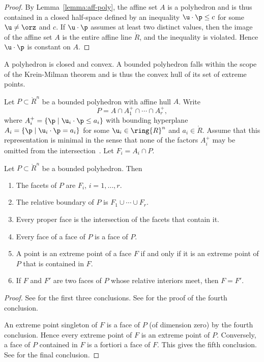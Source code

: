 \begin{proof}
By Lemma~\ref{lemma:aff-poly},
the affine set $A$ is a polyhedron and is thus contained in a closed half-space defined by an
inequality $\u\cdot\p \le c$ for some $\u\ne \orz$ and $c$.  If $\u\cdot\p$ assumes
at least two distinct values, then the image of the affine set $A$ 
is the entire affine line $\ring{R}$, and the inequality is violated.
Hence $\u\cdot\p$ is constant on $A$.
\end{proof}

A polyhedron is closed and convex.  A bounded polyhedron falls within
the scope of the Krein-Milman theorem and is thus the convex hull of
its set of extreme points.  %

Let $P\subset\ring{R}^n$ be a bounded polyhedron with affine hull
$A$. Write
\begin{equation}\label{eqn:polyrep}
P = A \cap A^+_1 \cap \cdots \cap A^+_r,
\end{equation}
where $A^+_i = \{\p\mid \u_i\cdot \p \le a_i\}$ with bounding
hyperplane $A_i=\{\p\mid \u_i \cdot \p = a_i\}$ for some $\u_i\in
\ring{R}^n$ and $a_i\in\ring{R}$.  Assume that this representation is
minimal in the sense that none of the factors $A^+_i$ may be omitted from
the intersection~.
Let $F_i = A_i\cap P$.  %


\begin{lemma}[]\label{lemma:webster}  
Let $P\subset\ring{R}^n$ be a bounded polyhedron.  Then
%
\begin{enumerate}
\item The facets of $P$ are $F_i$, $i=1,\ldots,r$.
\item The relative boundary of $P$ is $F_1\cup\cdots \cup F_r$.
\item Every proper face is the intersection of the facets that contain it.
\item Every face of a face of $P$ is a face of $P$.
\item A point is an extreme point of a face $F$ if and only if it is an extreme point of $P$
that is contained in $F$.
\item If $F$ and $F'$ are two faces of $P$ whose relative interiors
meet, then $F=F'$.
\end{enumerate}
\end{lemma}
%
%
%

\begin{proof} See \cite[Thm~3.2.1]{webster:1994} for the first three
conclusions.  See \cite[Th~2.6.5]{webster:1994} for the proof of the
fourth conclusion.

An extreme point singleton of $F$ is a face of $P$ (of
dimension zero) by the fourth conclusion.  Hence every extreme point of $F$
is an extreme point of $P$.  Conversely, a face of $P$ contained in $F$ is a
fortiori a face of $F$.  This gives the fifth conclusion.
See \cite[Cor~2.6.7]{webster:1994} for the final conclusion.
\end{proof}

